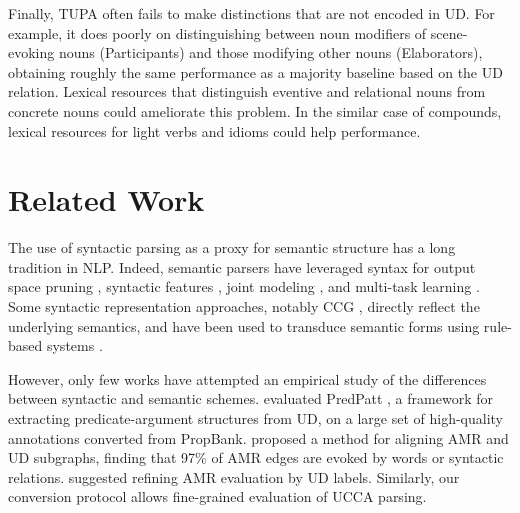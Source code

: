 \documentclass[11pt,a4paper]{article}
\begin{document}
Finally, TUPA often fails to make distinctions that are not encoded
in UD. For example, it does poorly on distinguishing between noun modifiers of
scene-evoking nouns (Participants) and those modifying other nouns (Elaborators),
obtaining roughly the same performance as 
a majority baseline based on the UD relation.
Lexical resources that distinguish eventive and relational nouns from concrete 
nouns could ameliorate this problem.
In the similar case of compounds, lexical resources for light verbs and idioms could
help performance.


\section{Related Work}\label{sec:related_work}

The use of syntactic parsing as a proxy for semantic structure has a long tradition in NLP.
Indeed, semantic parsers have leveraged syntax
for output space pruning \cite{xue2004calibrating}, 
syntactic features \cite{gildea2002automatic,N15-1007,E17-1045}, 
joint modeling \cite{surdeanu2008conll,hajivc2009conll}, and
multi-task learning \cite{swayamdipta2016greedy,swayamdipta2018syntactic,strubell2018linguistically}.
Some syntactic representation approaches, notably CCG \cite{Steedman:00},
directly reflect the underlying semantics, and have been used to
transduce semantic forms using rule-based systems \cite{Basile:12}.


  
However, only few works have attempted an empirical study of
the differences between syntactic and semantic schemes. 
 evaluated PredPatt \citep{white2016universal},
a framework for extracting predicate-argument structures from UD,
on a large set of high-quality annotations converted from PropBank.
 proposed a method for aligning AMR
\cite{banarescu2013abstract} and UD subgraphs,
finding that 97\% of AMR edges are evoked by words or syntactic relations.
 suggested refining AMR evaluation by UD labels.
Similarly, our conversion protocol allows fine-grained evaluation of UCCA parsing.
\end{document}

